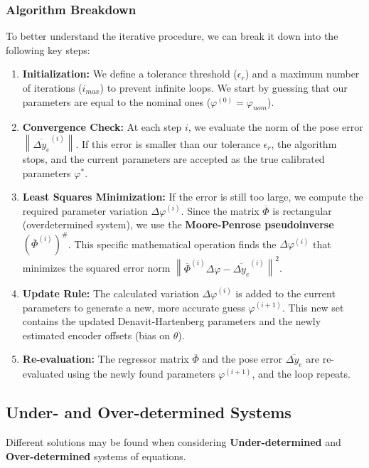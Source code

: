 \vspace{1em}

\subsubsection*{Algorithm Breakdown}
To better understand the iterative procedure, we can break it down into the following key steps:

\begin{enumerate}
    \item \textbf{Initialization:} We define a tolerance threshold ($\epsilon_r$) and a maximum number of iterations ($i_{max}$) to prevent infinite loops. We start by guessing that our parameters are equal to the nominal ones ($\varphi^{(0)} = \varphi_{nom}$).
    \item \textbf{Convergence Check:} At each step $i$, we evaluate the norm of the pose error $\left\| \overline{\Delta y_e}^{(i)} \right\|$. If this error is smaller than our tolerance $\epsilon_r$, the algorithm stops, and the current parameters are accepted as the true calibrated parameters $\varphi^*$.
    \item \textbf{Least Squares Minimization:} If the error is still too large, we compute the required parameter variation $\Delta \varphi^{(i)}$. Since the matrix $\overline{\Phi}$ is rectangular (overdetermined system), we use the \textbf{Moore-Penrose pseudoinverse} $\left(\overline{\Phi}^{(i)}\right)^\#$. This specific mathematical operation finds the $\Delta \varphi^{(i)}$ that minimizes the squared error norm $\left\| \overline{\Phi}^{(i)}\Delta \varphi - \overline{\Delta y_e}^{(i)} \right\|^2$.
    \item \textbf{Update Rule:} The calculated variation $\Delta \varphi^{(i)}$ is added to the current parameters to generate a new, more accurate guess $\varphi^{(i+1)}$. This new set contains the updated Denavit-Hartenberg parameters and the newly estimated encoder offsets (bias on $\theta$).
    \item \textbf{Re-evaluation:} The regressor matrix $\overline{\Phi}$ and the pose error $\overline{\Delta y_e}$ are re-evaluated using the newly found parameters $\varphi^{(i+1)}$, and the loop repeats.
\end{enumerate}

\subsection{Under- and Over-determined Systems}
Different solutions may be found when considering \textbf{Under-determined} and \textbf{Over-determined} 
systems of equations.

